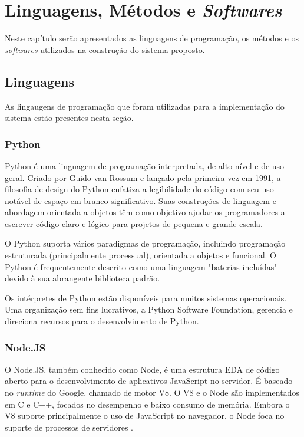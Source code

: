 \chapter{Linguagens, Métodos e \textit{Softwares}}
Neste capítulo serão apresentados as linguagens de programação, os métodos e os \textit{softwares} utilizados na construção do sistema proposto.
\section{Linguagens}
As lingaugens de programação que foram utilizadas para a implementação do sistema estão presentes nesta seção.
\subsection{Python}

Python é uma linguagem de programação interpretada, de alto nível e de uso geral. Criado por Guido van Rossum e lançado pela primeira vez em 1991, a filosofia de design do Python enfatiza a legibilidade do código com seu uso notável de espaço em branco significativo. Suas construções de linguagem e abordagem orientada a objetos têm como objetivo ajudar os programadores a escrever código claro e lógico para projetos de pequena e grande escala.

O Python suporta vários paradigmas de programação, incluindo programação estruturada (principalmente processual), orientada a objetos e funcional. O Python é frequentemente descrito como uma linguagem "baterias incluídas" devido à sua abrangente biblioteca padrão.

Os intérpretes de Python estão disponíveis para muitos sistemas operacionais. Uma organização sem fins lucrativos, a Python Software Foundation, gerencia e direciona recursos para o desenvolvimento de Python. \cite{van2007python}

\subsection{Node.JS}


O Node.JS, também conhecido como Node, é uma estrutura EDA de código aberto para o desenvolvimento de aplicativos JavaScript no servidor. É baseado no \textit{runtime} do Google, chamado de motor V8. O V8 e o Node são implementados em C e C++, focados no desempenho e baixo consumo de memória. Embora o V8 suporte principalmente o uso de JavaScript no navegador, o Node foca no suporte de processos de servidores \cite{Tilkov2010}.

